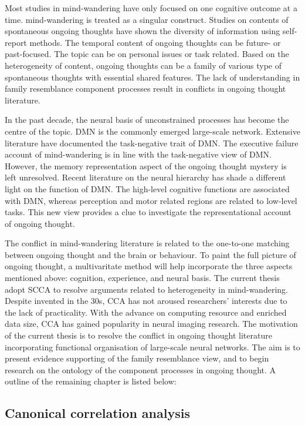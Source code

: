 Most studies in mind-wandering have only focused on one cognitive outcome at a time. mind-wandering is treated as a singular construct. Studies on contents of spontaneous ongoing thoughts have shown the diversity of information using self-report methods. The temporal content of ongoing thoughts can be future- or past-focused. The topic can be on personal issues or task related. Based on the heterogeneity of content, ongoing thoughts can be a family of various type of spontaneous thoughts with essential shared features. The lack of understanding in family resemblance component processes result in conflicts in ongoing thought literature.

In the past decade, the neural basis of unconstrained processes has become the centre of the topic. DMN is the commonly emerged large-scale network. Extensive literature have documented the task-negative trait of DMN. The executive failure account of mind-wandering is in line with the task-negative view of DMN. However, the memory representation aspect of the ongoing thought mystery is left unresolved. Recent literature on the neural hierarchy has shade a different light on the function of DMN. The high-level cognitive functions are associated with DMN, whereas perception and motor related regions are related to low-level tasks. This new view provides a clue to investigate the representational account of ongoing thought. 

The conflict in mind-wandering literature is related to the one-to-one matching between ongoing thought and the brain or behaviour. To paint the full picture of ongoing thought, a multivaritate method will help incorporate the three aspects mentioned above: cognition, experience, and neural basis. The current thesis adopt SCCA to resolve arguments related to heterogeneity in mind-wandering. Despite invented in the 30s, CCA has not aroused researchers’ interests due to the lack of practicality. With the advance on computing resource and enriched data size, CCA has gained popularity in neural imaging research. The motivation of the current thesis is to resolve the conflict in ongoing thought literature incorporating functional organisation of large-scale neural networks. The aim is to present evidence supporting of the family resemblance view, and to begin research on the ontology of the component processes in ongoing thought. A outline of the remaining chapter is listed below: 

\subsection*{Canonical correlation analysis}

